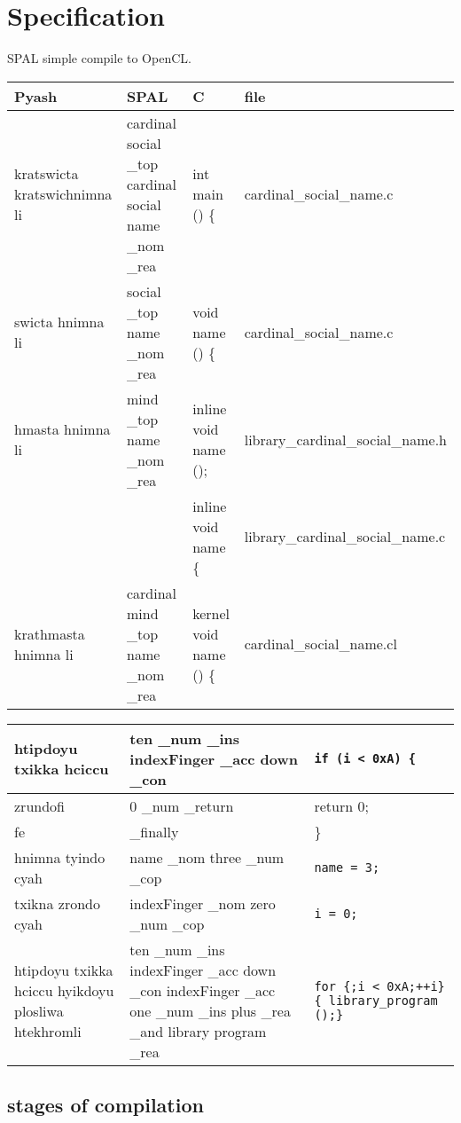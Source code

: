 \chapter{Specification}
SPAL simple compile to OpenCL.\@

\begin{sidewaystable}
\begin{tabulary}{\textwidth}{L|L|L|L}
Pyash & SPAL & C & file \\
\midrule 
\midrule 
kratswicta kratswichnimna li &
cardinal social \_top cardinal social name \_nom \_rea & int main () \{ & 
cardinal\_social\_name.c \\
\midrule
swicta hnimna li &
social \_top name \_nom \_rea & void name () \{ & cardinal\_social\_name.c \\
\midrule
hmasta hnimna li&
mind \_top name \_nom \_rea & inline void name (); &
library\_cardinal\_social\_name.h \\
& & inline void name\(\) \{ & library\_cardinal\_social\_name.c \\
\midrule
krathmasta hnimna li &
cardinal mind \_top name \_nom \_rea & kernel void name () \{ &
cardinal\_social\_name.cl \\
\end{tabulary}
\begin{tabulary}{\textwidth}{L|L|L}
\toprule
htipdoyu txikka hciccu &
ten \_num \_ins indexFinger \_acc down \_con & \texttt{if (i < 0xA) \{} \\
\midrule 
zrundofi  & 
0 \_num \_return & return 0; \\
\midrule
fe & 
\_finally & \} \\
\midrule
hnimna tyindo cyah &
name \_nom three \_num \_cop & \texttt{name = 3;} \\
\midrule 
txikna zrondo cyah &
indexFinger \_nom zero \_num \_cop & \texttt{i = 0;} \\
\midrule 
htipdoyu txikka hciccu hyikdoyu plosliwa htekhromli&
ten \_num \_ins indexFinger \_acc down \_con 
indexFinger \_acc one \_num \_ins plus \_rea \_and library program \_rea & 
\texttt{for \{;i < 0xA;\@ ++i\}\{ library\_program ();\}}  \\
\end{tabulary}
\end{sidewaystable}


\section{stages of compilation}


